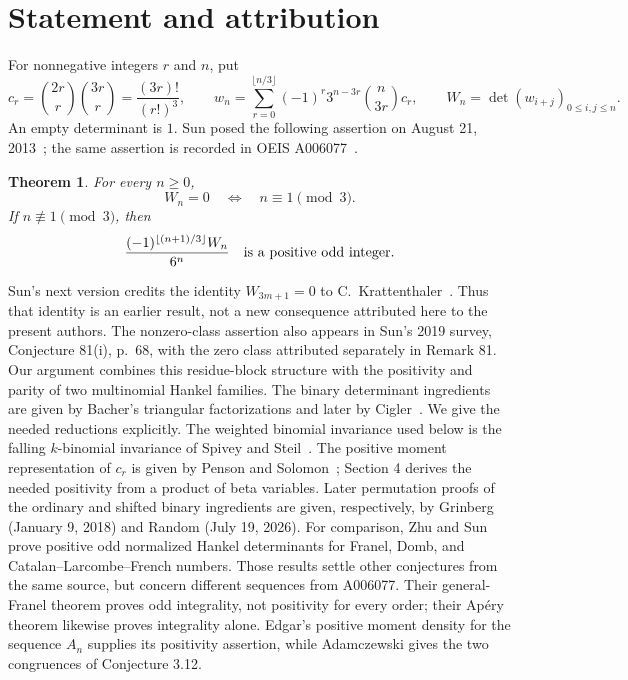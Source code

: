 \documentclass[11pt]{article}
\newtheorem{theorem}{Theorem}
\begin{document}
\section{Statement and attribution}
For nonnegative integers $r$ and $n$, put
\[
 c_r=\binom{2r}{r}\binom{3r}{r}=\frac{(3r)!}{(r!)^3},\qquad
 w_n=\sum_{r=0}^{\lfloor n/3\rfloor}(-1)^r3^{n-3r}\binom n{3r}c_r,
 \qquad W_n=\det(w_{i+j})_{0\leq i,j\leq n}.
\]
An empty determinant is $1$. Sun posed the following assertion on August 21,
2013~\cite[Conjecture 3.16, p.~17]{sun5}; the same assertion is recorded in
OEIS A006077~\cite{oeis}.
\begin{theorem}\label{thm:main}
For every $n\geq0$,
\[
 W_n=0\quad\Longleftrightarrow\quad n\equiv1\pmod3.
\]
If $n\not\equiv1\pmod3$, then
\[
 \frac{(-1)^{\lfloor(n+1)/3\rfloor}W_n}{6^n}
 \quad\hbox{is a positive odd integer.}
\]
\end{theorem}
Sun's next version credits the identity $W_{3m+1}=0$ to
C.\ Krattenthaler~\cite[Remark 3.16]{sun6}. Thus that identity is an earlier
result, not a new consequence attributed here to the present authors.
The nonzero-class assertion also appears in Sun's 2019 survey,
Conjecture 81(i), p.~68, with the zero class attributed separately in
Remark 81\cite{sun2019}.
Our argument combines this residue-block structure with the positivity and
parity of two multinomial Hankel families. The binary determinant ingredients
are given by Bacher's triangular factorizations\cite[Theorems 1.2(i) and 10.1(i)]{bacher}
and later by Cigler~\cite[Theorems 1.1 and 2.1]{cigler}. We give the needed reductions
explicitly. The weighted binomial invariance used below is the falling
$k$-binomial invariance of Spivey and Steil~\cite[Theorem 6.1]{spivey}.
The positive moment representation of $c_r$ is given by Penson and
Solomon~\cite[Example 9]{penson}; Section 4 derives the needed positivity
from a product of beta variables.
Later permutation proofs of the ordinary and shifted binary ingredients
are given, respectively, by Grinberg (January 9, 2018) and
Random (July 19, 2026)\cite{community}.
For comparison, Zhu and Sun~\cite[Theorems 1.1 and 1.2]{zhusun} prove
positive odd normalized Hankel determinants for Franel, Domb, and
Catalan--Larcombe--French numbers. Those results settle other conjectures
from the same source, but concern different sequences from A006077.
Their general-Franel theorem proves odd integrality, not positivity for
every order; their Ap\'ery theorem likewise proves integrality alone.
Edgar's positive moment density for the sequence $A_n$\cite[Theorem 1]{edgar}
supplies its positivity assertion, while Adamczewski\cite[Table 1, p.~16,
A228304]{adamczewski} gives the two congruences of Conjecture 3.12.
\end{document}
